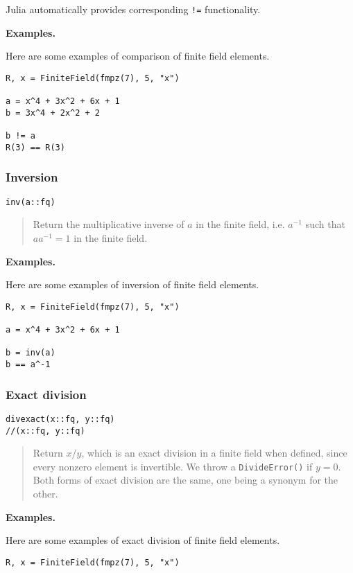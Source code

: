 \documentclass[a4paper,10pt]{article}
\newcommand{\code}{\lstinline}
\newcommand{\desc}[1]{\vspace{-3mm}\begin{quote}#1\end{quote}}
\begin{document}
{{Julia automatically provides corresponding \code{!=} functionality.

\textbf{Examples.}

Here are some examples of comparison of finite field elements.

\begin{lstlisting}
R, x = FiniteField(fmpz(7), 5, "x")

a = x^4 + 3x^2 + 6x + 1
b = 3x^4 + 2x^2 + 2

b != a
R(3) == R(3)
\end{lstlisting}

\subsubsection{Inversion}

\begin{lstlisting}
inv(a::fq)
\end{lstlisting}

\desc{Return the multiplicative inverse of $a$ in the finite field, i.e. 
$a^{-1}$ such that $aa^{-1} = 1$ in the finite field.}

\textbf{Examples.}

Here are some examples of inversion of finite field elements.

\begin{lstlisting}
R, x = FiniteField(fmpz(7), 5, "x")

a = x^4 + 3x^2 + 6x + 1

b = inv(a)
b == a^-1
\end{lstlisting}

\subsubsection{Exact division}

\begin{lstlisting}
divexact(x::fq, y::fq)
//(x::fq, y::fq)
\end{lstlisting}

\desc{Return $x/y$, which is an exact division in a finite field when defined,
since every nonzero element is invertible. We throw a \code{DivideError()} if
$y = 0$. Both forms of exact division are the same, one being a synonym for 
the other.}

\textbf{Examples.}

Here are some examples of exact division of finite field elements.

\begin{lstlisting}
R, x = FiniteField(fmpz(7), 5, "x")


\end{lstlisting}}}
\end{document}
